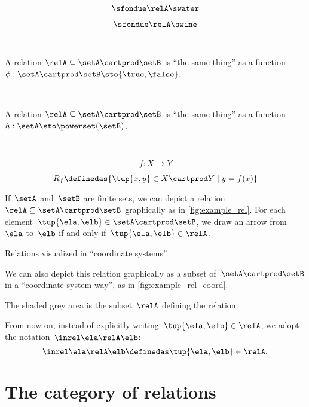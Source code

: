 {\begin{forslides}
        $$ \sfondue \relA \swater \label{eq:slides-17}$$

        $$ \sfondue \relA \swine \label{eq:slides-18}$$

        \

        A relation $\relA \subseteq \setA \cartprod \setB$ is ``the same thing'' as a function $\phi : \setA \cartprod \setB \sto \{\true, \false\}$.

        \

        A relation $\relA \subseteq \setA \cartprod \setB$ is ``the same thing'' as a function $h : \setA  \sto \powerset (\setB)$.

        \

        $$
            f : X \to Y
        $$

        $$
            R_f \definedas \{ \tup{x, y} \in X \cartprod Y \mid y = f(x) \}
        $$

    \end{forslides}
}

If~$\setA$ and~$\setB$ are finite sets, we can depict a relation~$\relA \subseteq \setA \cartprod \setB$ graphically as in \cref{fig:example_rel}.
For each element~$\tup{\ela,\elb} \in \setA \cartprod \setB$, we draw an arrow from~$\ela$ to~$\elb$ if and only if~$\tup{\ela,\elb} \in \relA$.

\begin{marginfigure}
    \centering
    \caption{Relations visualized in ``coordinate systems''.}
    \label{fig:example_rel_coord}
\end{marginfigure}

We can also depict this relation graphically as a subset of~$\setA \cartprod \setB$ in a ``coordinate system way'', as in \cref{fig:example_rel_coord}.

The shaded grey area is the subset~$\relA$ defining the relation.

\begin{remark}
    From now on, instead of explicitly writing~$\tup{\ela,\elb}\in \relA$, we adopt the notation~$\inrel \ela \relA \elb$:
    \begin{equation}
        \inrel \ela \relA \elb \definedas \tup{\ela,\elb}\in \relA.
    \end{equation}
\end{remark}

\section{The category of relations \Rel}

